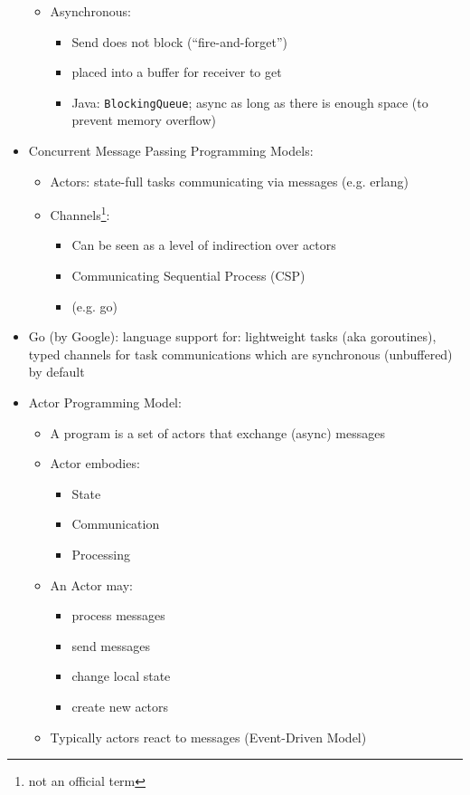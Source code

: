 \documentclass[a4paper]{article}
\newcommand{\inline}[1]{\lstinline!#1!}%
\begin{document}
\begin{itemize}
\begin{itemize}
\item Asynchronous: 
\begin{itemize}
\item Send does not block (``fire-and-forget'')
\item placed into a buffer for receiver to get
\item Java: \inline{BlockingQueue}; async as long as there is enough space (to prevent memory overflow)
\end{itemize}
\end{itemize}
\item Concurrent Message Passing Programming Models: 
\begin{itemize}
\item Actors: state-full tasks communicating via messages (e.g. erlang)
\item Channels\footnote{not an official term}: 
\begin{itemize}
\item Can be seen as a level of indirection over actors
\item Communicating Sequential Process (CSP)
\item (e.g. go)
\end{itemize}
\end{itemize}
\item Go (by Google): language support for: lightweight tasks (aka goroutines), typed channels for task communications which are synchronous (unbuffered) by default 
\item Actor Programming Model: 
\begin{itemize}
\item A program is a set of actors that exchange (async) messages
\item Actor embodies:
\begin{itemize}
\item State
\item Communication
\item Processing
\end{itemize}
\item An Actor may:
\begin{itemize}
\item process messages
\item send messages
\item change local state
\item create new actors
\end{itemize}
\item Typically actors react to messages (Event-Driven Model)

\end{itemize}
\end{itemize}
\end{document}
